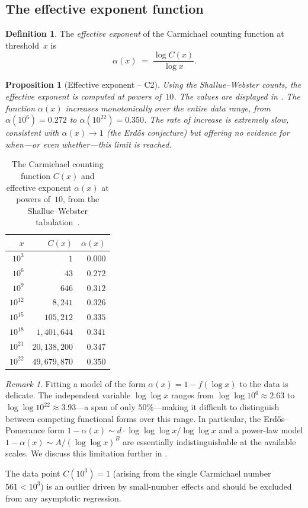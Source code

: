 \documentclass[12pt]{amsart}
\theoremstyle{plain}
\newtheorem{proposition}[theorem]{Proposition}
\theoremstyle{definition}
\newtheorem{definition}[theorem]{Definition}
\theoremstyle{remark}
\newtheorem{remark}[theorem]{Remark}
\begin{document}
\subsection{The effective exponent function}\label{subsec:C2}

\begin{definition}\label{def:alpha}
The \emph{effective exponent} of the Carmichael counting function at
threshold~$x$ is
\[
  \alpha(x) \;=\; \frac{\log C(x)}{\log x}.
\]
\end{definition}

\begin{proposition}[Effective exponent -- C2]\label{prop:C2}
Using the Shallue--Webster counts, the effective exponent is computed
at powers of~$10$.  The values are displayed in .
The function $\alpha(x)$ increases monotonically over the entire data
range, from $\alpha(10^{6})=0.272$ to $\alpha(10^{22})=0.350$.  The
rate of increase is extremely slow, consistent with $\alpha(x)\to 1$
(the Erd\H{o}s conjecture) but offering no evidence for when---or
even whether---this limit is reached.
\end{proposition}

\begin{table}[ht]
\centering
\caption{The Carmichael counting function $C(x)$ and effective exponent
  $\alpha(x)$ at powers of~$10$, from the Shallue--Webster
  tabulation~\cite{shalluewebster2024}.}
\label{tab:C2}
\begin{tabular}{@{}rr@{\qquad}r@{}}
\toprule
$x$ & $C(x)$ & $\alpha(x)$ \\
\midrule
$10^{3}$  & $1$ & $0.000$ \\
$10^{6}$  & $43$ & $0.272$ \\
$10^{9}$  & $646$ & $0.312$ \\
$10^{12}$ & $8{,}241$ & $0.326$ \\
$10^{15}$ & $105{,}212$ & $0.335$ \\
$10^{18}$ & $1{,}401{,}644$ & $0.341$ \\
$10^{21}$ & $20{,}138{,}200$ & $0.347$ \\
$10^{22}$ & $49{,}679{,}870$ & $0.350$ \\
\bottomrule
\end{tabular}
\end{table}

\begin{remark}\label{rem:C2_regression}
Fitting a model of the form $\alpha(x)=1-f(\log x)$ to the data is
delicate.  The independent variable $\log\log x$ ranges from
$\log\log 10^{6}\approx 2.63$ to $\log\log 10^{22}\approx 3.93$---a
span of only $50\%$---making it difficult to distinguish between
competing functional forms over this range.  In particular, the
Erd\H{o}s--Pomerance form $1-\alpha(x)\sim
d\cdot\log\log\log x/\log\log x$ and a power-law model
$1-\alpha(x)\sim A/(\log\log x)^{B}$ are essentially
indistinguishable at the available scales.  We discuss this limitation
further in .

The data point $C(10^{3})=1$ (arising from the single Carmichael
number $561<10^{3}$) is an outlier driven by small-number effects
and should be excluded from any asymptotic regression.
\end{remark}
\end{document}
